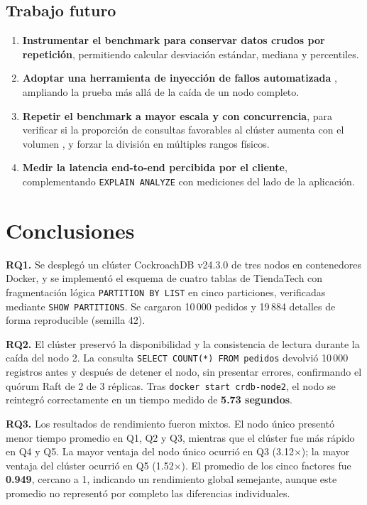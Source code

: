\documentclass[10pt,letterpaper]{article}
\begin{document}
\subsection{Trabajo futuro}
\label{sec:trabajofuturo}
\begin{enumerate}[leftmargin=*]
\item \textbf{Instrumentar el benchmark para conservar datos crudos por repetición}, permitiendo calcular desviación estándar, mediana y percentiles.
\item \textbf{Adoptar una herramienta de inyección de fallos automatizada} \citep{assad2024fault}, ampliando la prueba más allá de la caída de un nodo completo.
\item \textbf{Repetir el benchmark a mayor escala y con concurrencia}, para verificar si la proporción de consultas favorables al clúster aumenta con el volumen \citep{pina2023newsql}, y forzar la división en múltiples rangos físicos.
\item \textbf{Medir la latencia end-to-end percibida por el cliente}, complementando \texttt{EXPLAIN ANALYZE} con mediciones del lado de la aplicación.
\end{enumerate}

\section{Conclusiones}
\label{sec:conclusiones}
\textbf{RQ1.} Se desplegó un clúster CockroachDB v24.3.0 de tres nodos en contenedores Docker, y se implementó el esquema de cuatro tablas de TiendaTech con fragmentación lógica \texttt{PARTITION BY LIST} en cinco particiones, verificadas mediante \texttt{SHOW PARTITIONS}. Se cargaron 10\,000 pedidos y 19\,884 detalles de forma reproducible (semilla 42).

\textbf{RQ2.} El clúster preservó la disponibilidad y la consistencia de lectura durante la caída del nodo 2. La consulta \texttt{SELECT COUNT(*) FROM pedidos} devolvió 10\,000 registros antes y después de detener el nodo, sin presentar errores, confirmando el quórum Raft de 2 de 3 réplicas. Tras \texttt{docker start crdb-node2}, el nodo se reintegró correctamente en un tiempo medido de \textbf{5.73 segundos}.

\textbf{RQ3.} Los resultados de rendimiento fueron mixtos. El nodo único presentó menor tiempo promedio en Q1, Q2 y Q3, mientras que el clúster fue más rápido en Q4 y Q5. La mayor ventaja del nodo único ocurrió en Q3 (3.12$\times$); la mayor ventaja del clúster ocurrió en Q5 (1.52$\times$). El promedio de los cinco factores fue \textbf{0.949}, cercano a 1, indicando un rendimiento global semejante, aunque este promedio no representó por completo las diferencias individuales.
\end{document}
